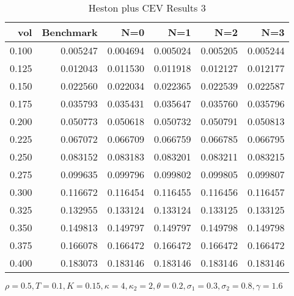 \begin{table}[ht]
  \centering
  \caption{Heston plus CEV Results 3}
  \begin{tabular}{rrrrrr}
  \toprule
    vol &       Benchmark &       N=0 &       N=1 &       N=2 &       N=3 \\
  \midrule
  0.100 & 0.005247 & 0.004694 & 0.005024 & 0.005205 & 0.005244 \\
  0.125 & 0.012043 & 0.011530 & 0.011918 & 0.012127 & 0.012177 \\
  0.150 & 0.022560 & 0.022034 & 0.022365 & 0.022539 & 0.022587 \\
  0.175 & 0.035793 & 0.035431 & 0.035647 & 0.035760 & 0.035796 \\
  0.200 & 0.050773 & 0.050618 & 0.050732 & 0.050791 & 0.050813 \\
  0.225 & 0.067072 & 0.066709 & 0.066759 & 0.066785 & 0.066795 \\
  0.250 & 0.083152 & 0.083183 & 0.083201 & 0.083211 & 0.083215 \\
  0.275 & 0.099635 & 0.099796 & 0.099802 & 0.099805 & 0.099807 \\
  0.300 & 0.116672 & 0.116454 & 0.116455 & 0.116456 & 0.116457 \\
  0.325 & 0.132955 & 0.133124 & 0.133124 & 0.133125 & 0.133125 \\
  0.350 & 0.149813 & 0.149797 & 0.149797 & 0.149798 & 0.149798 \\
  0.375 & 0.166078 & 0.166472 & 0.166472 & 0.166472 & 0.166472 \\
  0.400 & 0.183073 & 0.183146 & 0.183146 & 0.183146 & 0.183146 \\
  \bottomrule
  \end{tabular}
  \small{$\rho = 0.5,T=0.1,K=0.15, \kappa = 4, \kappa_2 =2, \theta =0.2, \sigma_1 =0.3, \sigma_2 = 0.8, \gamma = 1.6$}
  \end{table}


